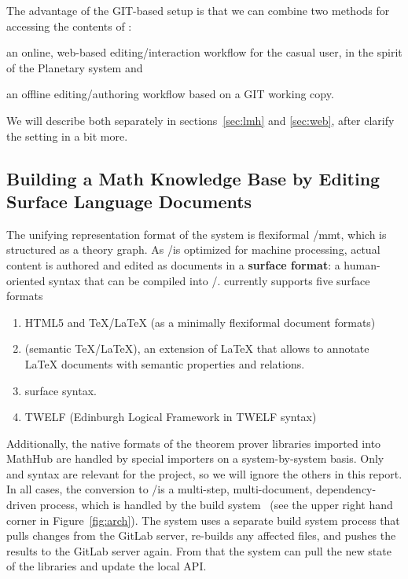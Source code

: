 The advantage of the GIT-based setup is that we can combine two methods for accessing the
contents of \sys:
\begin{compactenum}[\em i\rm)]
\item an online, web-based editing/interaction workflow for the casual user, in the spirit
  of the Planetary system and
\item an offline editing/authoring workflow based on a GIT working copy.
\end{compactenum}
We will describe both separately in sections~\ref{sec:lmh} and \ref{sec:web}, after
clarify the setting in \sys a bit more. 

\subsection{Building a Math Knowledge Base by Editing Surface Language Documents}\label{sec:surface}

The unifying representation format of the \sys system is flexiformal \omdoc/mmt, which is
structured as a theory graph. As \omdoc/\mmt is optimized for machine processing, actual
content is authored and edited as documents in a \textbf{surface format}: a human-oriented
syntax that can be compiled into \omdoc/\mmt. \sys currently supports five surface formats 
\begin{enumerate}
\item HTML5 and {\TeX/\LaTeX} (as a minimally flexiformal document formats)
\item \sTeX (semantic {\TeX/\LaTeX}), an extension of {\LaTeX} that allows to annotate
  {\LaTeX} documents with semantic properties and relations.
\item \mmt surface syntax.
\item TWELF (Edinburgh Logical Framework in TWELF syntax)
\end{enumerate}
Additionally, the native formats of the theorem prover libraries imported into MathHub are
handled by special importers on a system-by-system basis. Only \sTeX and \mmt syntax are
relevant for the \pn project, so we will ignore the others in this report. In all cases,
the conversion to \omdoc/\mmt is a multi-step, multi-document, dependency-driven process,
which is handled by the \mmt build system~\cite{mmt:buildsys:on} (see the upper right hand
corner in Figure~\ref{fig:arch}). The \sys system uses a separate build system process
that pulls changes from the \sys GitLab server, re-builds any affected files, and pushes
the results to the \sys GitLab server again. From that the \sys system can pull the new
state of the libraries and update the local \mmt API.

